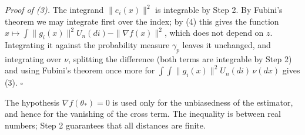 \documentclass[11pt,a4paper]{article}
\begin{document}
\emph{Proof of (3).} The integrand \(\|e_i(x)\|^2\) is integrable by Step 2. By Fubini's theorem we may integrate first over the index; by (4) this gives the function \(x\mapsto\int\|g_i(x)\|^2U_n(di)-\|\nabla f(x)\|^2\), which does not depend on \(z\). Integrating it against the probability measure \(\gamma_p\) leaves it unchanged, and integrating over \(\nu\), splitting the difference (both terms are integrable by Step 2) and using Fubini's theorem once more for \(\int\!\int\|g_i(x)\|^2U_n(di)\,\nu(dx)\) gives (3). \(\square\)




The hypothesis \(\nabla f(\theta_*)=0\) is used only for the unbiasedness of the estimator, and hence for the vanishing of the cross term. The inequality is between real numbers; Step 2 guarantees that all distances are finite.
\end{document}
